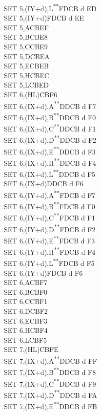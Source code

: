 \documentclass[twoside,openright,a4paper]{book}
\newcommand{\UNDOC}{\textnormal{\textsuperscript{**}}}
\begin{document}
\begin{multicols}{3}
{\begin{tabbing}
	SET 5,(IY+d),L\UNDOC\>FDCB d ED\\
	SET 5,(IY+d)\>FDCB d EE\\
	SET 5,A\>CBEF\\
	SET 5,B\>CBE8\\
	SET 5,C\>CBE9\\
	SET 5,D\>CBEA\\
	SET 5,E\>CBEB\\
	SET 5,H\>CBEC\\
	SET 5,L\>CBED\\
	SET 6,(HL)\>CBF6\\
	SET 6,(IX+d),A\UNDOC\>DDCB d F7\\
	SET 6,(IX+d),B\UNDOC\>DDCB d F0\\
	SET 6,(IX+d),C\UNDOC\>DDCB d F1\\
	SET 6,(IX+d),D\UNDOC\>DDCB d F2\\
	SET 6,(IX+d),E\UNDOC\>DDCB d F3\\
	SET 6,(IX+d),H\UNDOC\>DDCB d F4\\
	SET 6,(IX+d),L\UNDOC\>DDCB d F5\\
	SET 6,(IX+d)\>DDCB d F6\\
	SET 6,(IY+d),A\UNDOC\>FDCB d F7\\
	SET 6,(IY+d),B\UNDOC\>FDCB d F0\\
	SET 6,(IY+d),C\UNDOC\>FDCB d F1\\
	SET 6,(IY+d),D\UNDOC\>FDCB d F2\\
	SET 6,(IY+d),E\UNDOC\>FDCB d F3\\
	SET 6,(IY+d),H\UNDOC\>FDCB d F4\\
	SET 6,(IY+d),L\UNDOC\>FDCB d F5\\
	SET 6,(IY+d)\>FDCB d F6\\
	SET 6,A\>CBF7\\
	SET 6,B\>CBF0\\
	SET 6,C\>CBF1\\
	SET 6,D\>CBF2\\
	SET 6,E\>CBF3\\
	SET 6,H\>CBF4\\
	SET 6,L\>CBF5\\
	SET 7,(HL)\>CBFE\\
	SET 7,(IX+d),A\UNDOC\>DDCB d FF\\
	SET 7,(IX+d),B\UNDOC\>DDCB d F8\\
	SET 7,(IX+d),C\UNDOC\>DDCB d F9\\
	SET 7,(IX+d),D\UNDOC\>DDCB d FA\\
	SET 7,(IX+d),E\UNDOC\>DDCB d FB\\

\end{tabbing}}
\end{multicols}
\end{document}
